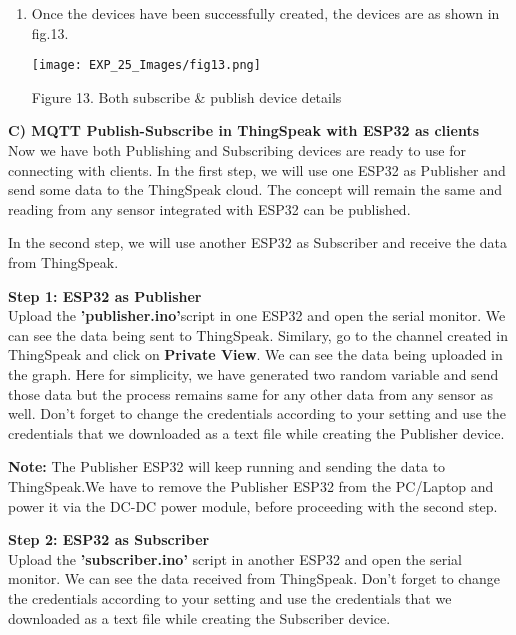 \documentclass[12pt,a4paper]{article}
\begin{document}
\begin{justify}
\begin{enumerate}
\begin{center} 
\texttt{[image: EXP\_25\_Images/fig12.png]}
\end{center}
\begin{center} {Figure 12. Creating subscribe device }\end{center}

\item Once the devices have been successfully created, the devices are as shown in fig.13.

\begin{center} 
\texttt{[image: EXP\_25\_Images/fig13.png]}
\end{center}
\begin{center} {Figure 13. Both subscribe \& publish device details}\end{center}
\end{enumerate}

\noindent \textbf{C)	MQTT Publish-Subscribe in ThingSpeak with ESP32 as clients}\\[6pt]
Now we have both Publishing and Subscribing devices are ready to use for connecting with clients. In the first step, we will use one ESP32 as Publisher and send some data to the ThingSpeak cloud. The concept will remain the same and reading from any sensor integrated with ESP32 can be published.\par
\noindent In the second step, we will use another ESP32 as Subscriber and receive the data from ThingSpeak.\par

\noindent \textbf{Step 1: ESP32 as Publisher}\\
Upload the \textbf{'publisher.ino'}script in one ESP32 and open the serial monitor. We can see the data being sent to ThingSpeak. Similary, go to the channel created in ThingSpeak and click on \textbf{Private View}. We can see the data being uploaded in the graph. Here for simplicity, we have generated two random variable and send those data but the process remains same for any other data from any sensor as well. Don't forget to change the credentials according to your setting and use the credentials that we downloaded as a text file while creating the Publisher device.\par
\noindent \textbf{Note:} The Publisher ESP32 will keep running and sending the data to ThingSpeak.We have to remove the Publisher ESP32 from the PC/Laptop and power it via the DC-DC power module, before proceeding with the second step.

\noindent\textbf{Step 2: ESP32 as Subscriber}\\
Upload the \textbf{'subscriber.ino'} script in another ESP32 and open the serial monitor. We can see the data received from ThingSpeak. Don't forget to change the credentials according to your setting and use the credentials that we downloaded as a text file while creating the Subscriber device.



\end{justify}
\end{document}
